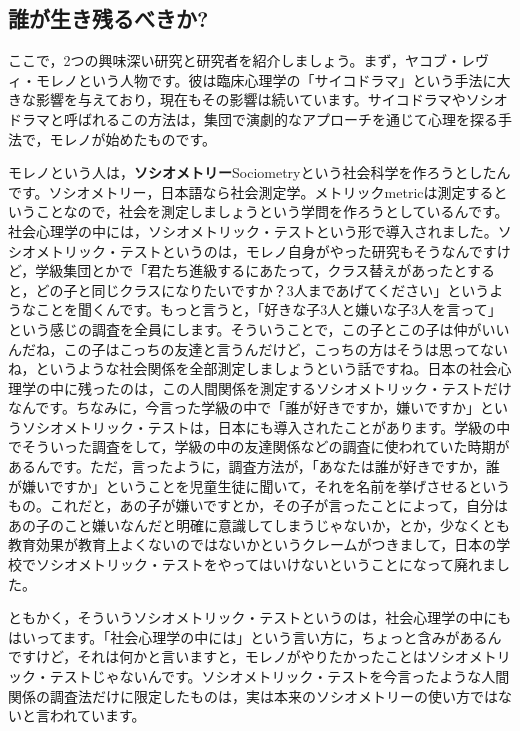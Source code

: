 \documentclass{ltjsbook}
\begin{document}
\subsection{誰が生き残るべきか?}
ここで，2つの興味深い研究と研究者を紹介しましょう。まず，ヤコブ・レヴィ・モレノという人物です。彼は臨床心理学の「サイコドラマ」という手法に大きな影響を与えており，現在もその影響は続いています。サイコドラマやソシオドラマと呼ばれるこの方法は，集団で演劇的なアプローチを通じて心理を探る手法で，モレノが始めたものです。

モレノという人は，\textbf{ソシオメトリー}Sociometryという社会科学を作ろうとしたんです。ソシオメトリー，日本語なら社会測定学。メトリックmetricは測定するということなので，社会を測定しましょうという学問を作ろうとしているんです。社会心理学の中には，ソシオメトリック・テストという形で導入されました。ソシオメトリック・テストというのは，モレノ自身がやった研究もそうなんですけど，学級集団とかで「君たち進級するにあたって，クラス替えがあったとすると，どの子と同じクラスになりたいですか？3人まであげてください」というようなことを聞くんです。もっと言うと，「好きな子3人と嫌いな子3人を言って」という感じの調査を全員にします。そういうことで，この子とこの子は仲がいいんだね，この子はこっちの友達と言うんだけど，こっちの方はそうは思ってないね，というような社会関係を全部測定しましょうという話ですね。日本の社会心理学の中に残ったのは，この人間関係を測定するソシオメトリック・テストだけなんです。ちなみに，今言った学級の中で「誰が好きですか，嫌いですか」というソシオメトリック・テストは，日本にも導入されたことがあります。学級の中でそういった調査をして，学級の中の友達関係などの調査に使われていた時期があるんです。ただ，言ったように，調査方法が，「あなたは誰が好きですか，誰が嫌いですか」ということを児童生徒に聞いて，それを名前を挙げさせるというもの。これだと，あの子が嫌いですとか，その子が言ったことによって，自分はあの子のこと嫌いなんだと明確に意識してしまうじゃないか，とか，少なくとも教育効果が教育上よくないのではないかというクレームがつきまして，日本の学校でソシオメトリック・テストをやってはいけないということになって廃れました。

ともかく，そういうソシオメトリック・テストというのは，社会心理学の中にもはいってます。「社会心理学の中には」という言い方に，ちょっと含みがあるんですけど，それは何かと言いますと，モレノがやりたかったことはソシオメトリック・テストじゃないんです。ソシオメトリック・テストを今言ったような人間関係の調査法だけに限定したものは，実は本来のソシオメトリーの使い方ではないと言われています。
\end{document}
